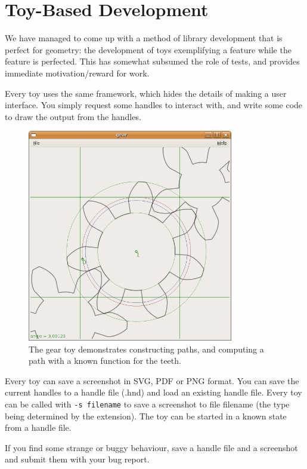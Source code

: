 \documentclass[openany]{book}
\begin{document}
\section{Toy-Based Development}
We have managed to come up with a method of library development
that is perfect for geometry: the development of toys exemplifying
a feature while the feature is perfected.  This has somewhat subsumed
the role of tests, and provides immediate motivation/reward for work.

Every toy uses the same framework, which hides the details of making a
user interface.  You simply request some handles to interact with, and
write some code to draw the output from the handles.  

\begin{figure}
  \begin{center}
    \includegraphics[width=90mm]{media/gear.png}
    \caption{The gear toy demonstrates constructing paths, and computing a path with a known function for the teeth.}
    \label{fig:gear-toy}
  \end{center}
\end{figure}

Every toy can save a screenshot in SVG, PDF or PNG format.  You can
save the current handles to a handle file (.hnd) and load an existing
handle file.  Every toy can be called with \verb|-s filename| to save
a screenshot to file filename (the type being determined by the
extension).  The toy can be started in a known state from a handle
file.

If you find some strange or buggy behaviour, save a handle file and a
screenshot and submit them with your bug report.
\end{document}
